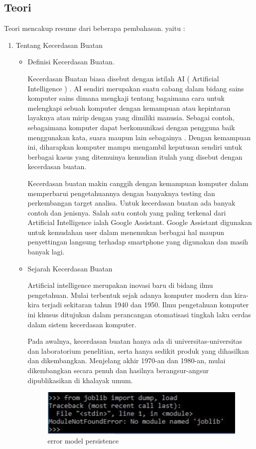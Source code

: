 \subsection{Teori}
Teori mencakup resume dari beberapa pembahasan. yaitu :
\begin{enumerate}
\item Tentang Kecerdasan Buatan
\begin{itemize}
\item Definisi Kecerdasan Buatan.
\par Kecerdasan Buatan biasa disebut dengan istilah AI ( Artificial Intelligence ) . AI sendiri merupakan suatu cabang dalam bidang sains komputer sains dimana mengkaji tentang bagaimana cara untuk melengkapi sebuah komputer dengan kemampuan atau kepintaran layaknya atau mirip dengan yang dimiliki manusia. Sebagai contoh, sebagaimana komputer dapat berkomunikasi dengan pengguna baik menggunakan kata, suara maupun lain sebagainya . Dengan kemampuan ini, diharapkan komputer mampu mengambil keputusan sendiri untuk berbagai kasus yang ditemuinya kemudian itulah yang disebut dengan kecerdasan buatan.
\par  Kecerdasan buatan makin canggih dengan kemampuan komputer dalam memperbarui pengetahuannya dengan banyaknya testing dan perkembangan target analisa. Untuk kecerdasan buatan ada banyak contoh dan jenisnya. Salah satu contoh yang paling terkenal dari Artificial Intelligence ialah Google Assistant. Google Assistant digunakan untuk kemudahan user dalam menemukan berbagai hal maupun penyettingan langsung terhadap smartphone yang digunakan dan masih banyak lagi.
\item Sejarah Kecerdasan Buatan

\par Artificial intelligence merupakan inovasi baru di bidang ilmu pengetahuan. Mulai terbentuk sejak adanya komputer modern dan kira-kira terjadi sekitaran tahun 1940 dan 1950. Ilmu pengetahuan komputer ini khusus ditujukan dalam perancangan otomatisasi tingkah laku cerdas dalam sistem kecerdasan komputer.
\par Pada awalnya, kecerdasan buatan hanya ada di universitas-universitas dan laboratorium penelitian, serta hanya sedikit produk yang dihasilkan dan dikembangkan. Menjelang akhir 1970-an dan 1980-an, mulai dikembangkan secara penuh dan hasilnya berangsur-angsur dipublikasikan di khalayak umum.
\par

\begin{figure}[ht]
\centering
\includegraphics[scale=0.6]{figures/er.jpg}
\caption{error model persistence}
\label{contoh}
\end{figure}


\end{itemize}
\end{enumerate}
